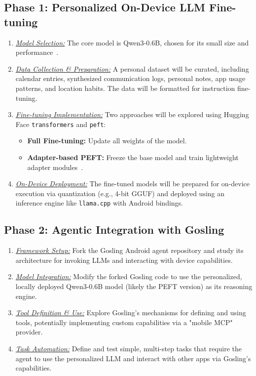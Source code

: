 \documentclass[conference]{IEEEtran}
\begin{document}
\subsection{Phase 1: Personalized On-Device LLM Fine-tuning}
\begin{enumerate}
    \item \textit{\uline{Model Selection:}} The core model is Qwen3-0.6B, chosen for its small size and performance~\cite{qwen}.
    \item \textit{\uline{Data Collection \& Preparation:}} A personal dataset will be curated, including calendar entries, synthesized communication logs, personal notes, app usage patterns, and location habits. The data will be formatted for instruction fine-tuning.
    \item \textit{\uline{Fine-tuning Implementation:}} Two approaches will be explored using Hugging Face \texttt{transformers} and \texttt{peft}:
    \begin{itemize}
        \item \textbf{Full Fine-tuning:} Update all weights of the model.
        \item \textbf{Adapter-based PEFT:} Freeze the base model and train lightweight adapter modules~\cite{adapterspaper, lora, qlora}.
    \end{itemize}
    \item \textit{\uline{On-Device Deployment:}} The fine-tuned models will be prepared for on-device execution via quantization (e.g., 4-bit GGUF) and deployed using an inference engine like \texttt{llama.cpp} with Android bindings.
\end{enumerate}

\subsection{Phase 2: Agentic Integration with Gosling}
\begin{enumerate}
    \item \textit{\uline{Framework Setup:}} Fork the Gosling Android agent repository and study its architecture for invoking LLMs and interacting with device capabilities.
    \item \textit{\uline{Model Integration:}} Modify the forked Gosling code to use the personalized, locally deployed Qwen3-0.6B model (likely the PEFT version) as its reasoning engine.
    \item \textit{\uline{Tool Definition \& Use:}} Explore Gosling's mechanisms for defining and using tools, potentially implementing custom capabilities via a "mobile MCP" provider.
    \item \textit{\uline{Task Automation:}} Define and test simple, multi-step tasks that require the agent to use the personalized LLM and interact with other apps via Gosling's capabilities.
\end{enumerate}
\end{document}
